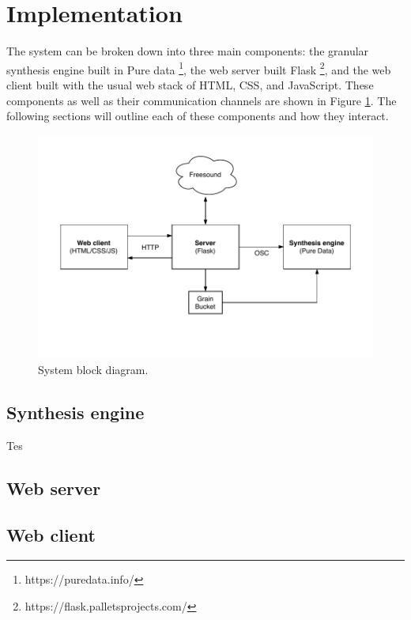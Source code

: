 \documentclass{nime-alternate}
\begin{document}
\section{Implementation}

The system can be broken down into three main components: 
the granular synthesis engine built in Pure data \footnote{https://puredata.info/}, 
the web server built Flask \footnote{https://flask.palletsprojects.com/}, 
and the web client built with the usual web stack of HTML, CSS, and JavaScript. 
These components as well as their communication channels are shown in Figure \ref{fig:block-diagram}.
The following sections will outline each of these components and how they interact. 

\begin{figure} \label{fig:block-diagram}
	\includegraphics[width=\linewidth]{../img/granabular-system.pdf}
	\caption{System block diagram.}
	\centering
\end{figure}

\subsection{Synthesis engine}

Tes

\subsection{Web server}

\subsection{Web client}
\end{document}
